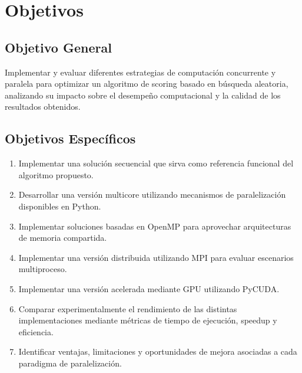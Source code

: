 \chapter{Objetivos}

\section{Objetivo General}

Implementar y evaluar diferentes estrategias de computación concurrente y paralela para optimizar un algoritmo de scoring basado en búsqueda aleatoria, analizando su impacto sobre el desempeño computacional y la calidad de los resultados obtenidos.

\section{Objetivos Específicos}

\begin{enumerate}
    \item Implementar una solución secuencial que sirva como referencia funcional del algoritmo propuesto.

    \item Desarrollar una versión multicore utilizando mecanismos de paralelización disponibles en Python.

    \item Implementar soluciones basadas en OpenMP para aprovechar arquitecturas de memoria compartida.

    \item Implementar una versión distribuida utilizando MPI para evaluar escenarios multiproceso.

    \item Implementar una versión acelerada mediante GPU utilizando PyCUDA.

    \item Comparar experimentalmente el rendimiento de las distintas implementaciones mediante métricas de tiempo de ejecución, speedup y eficiencia.

    \item Identificar ventajas, limitaciones y oportunidades de mejora asociadas a cada paradigma de paralelización.
\end{enumerate}